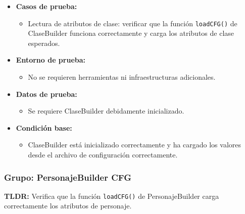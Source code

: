 \documentclass{article}
\begin{document}
\begin{itemize}
	\item \textbf{Casos de prueba:}
	\begin{itemize}
		\item Lectura de atributos de clase: verificar que la función \texttt{loadCFG()} de ClaseBuilder funciona correctamente y carga los atributos de clase esperados.
	\end{itemize}
	
	\item \textbf{Entorno de prueba:}
	\begin{itemize}
		\item No se requieren herramientas ni infraestructuras adicionales.
	\end{itemize}
	
	\item \textbf{Datos de prueba:}
	\begin{itemize}
		\item Se requiere ClaseBuilder debidamente inicializado.
	\end{itemize}
	
	\item \textbf{Condición base:}
	\begin{itemize}
		\item ClaseBuilder está inicializado correctamente y ha cargado los valores desde el archivo de configuración correctamente.
	\end{itemize}
\end{itemize}


\subsubsection{Grupo: PersonajeBuilder CFG}
\textbf{TLDR:} Verifica que la función \texttt{loadCFG()} de PersonajeBuilder carga correctamente los atributos de personaje.
\end{document}

